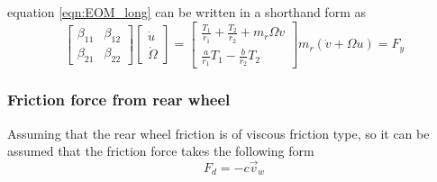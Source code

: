 \documentclass{article}
\begin{document}
	 equation \ref{eqn:EOM_long} can be written in a shorthand form as 
	 \begin{subequations}
	 	\begin{equation}
	 	\begin{bmatrix}
	 	\beta_{11} & \beta_{12}\\\beta_{21}&\beta_{22}
	 	\end{bmatrix}\begin{bmatrix}
	 	\dot{u}\\\dot{\Omega}
	 	\end{bmatrix} = \begin{bmatrix}
	 	\frac{T_1}{r_1}+\frac{T_2}{r_2}+m_r\Omega v\\\frac{a}{r_1}T_1-\frac{b}{r_2}T_2
	 	\end{bmatrix}
	 	\end{equation}
	 	\begin{equation}
		m_r\left(\dot{v}+\Omega u\right) = F_y
	 	\end{equation}
	 	\label{eqn:shorthand}
	 \end{subequations}
	 \subsubsection{Friction force from rear wheel}
	 Assuming that the rear wheel friction is of viscous friction type, so it can be assumed that the friction force takes the following form 
	 \begin{equation}
	 F_d = -c\vec{v}_w
	 \label{eqn:friction}
	 \end{equation}
	 
\end{document}
